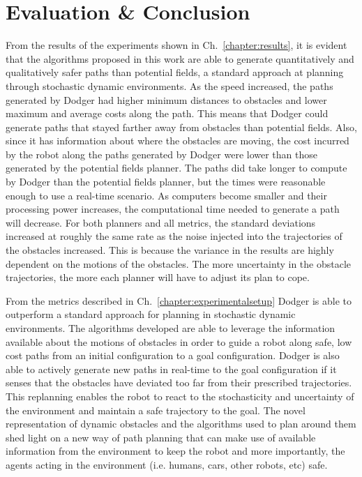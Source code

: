 \section{Evaluation \& Conclusion}

From the results of the experiments shown in Ch.~\ref{chapter:results}, it is
evident that the algorithms proposed in this work are able to generate
quantitatively and qualitatively safer paths than potential fields, a standard
approach at planning through stochastic dynamic environments. As the speed
increased, the paths generated by Dodger had higher minimum distances to
obstacles and lower maximum and average costs along the path. This means that
Dodger could generate paths that stayed farther away from obstacles than
potential fields. Also, since it has information about where the obstacles are
moving, the cost incurred by the robot along the paths generated by Dodger were
lower than those generated by the potential fields planner. The paths did take
longer to compute by Dodger than the potential fields planner, but the times
were reasonable enough to use a real-time scenario. As computers become smaller
and their processing power increases, the computational time needed to generate
a path will decrease. For both planners and all metrics, the standard
deviations increased at roughly the same rate as the noise injected into the
trajectories of the obstacles increased. This is because the variance in the
results are highly dependent on the motions of the obstacles. The more
uncertainty in the obstacle trajectories, the more each planner will have to
adjust its plan to cope.

From the metrics described in Ch.~\ref{chapter:experimentalsetup} Dodger is
able to outperform a standard approach for planning in stochastic dynamic
environments. The algorithms developed are able to leverage the information
available about the motions of obstacles in order to guide a robot along safe,
low cost paths from an initial configuration to a goal configuration. Dodger is
also able to actively generate new paths in real-time to the goal configuration
if it senses that the obstacles have deviated too far from their prescribed
trajectories. This replanning enables the robot to react to the stochasticity
and uncertainty of the environment and maintain a safe trajectory to the goal.
The novel representation of dynamic obstacles and the algorithms used to plan
around them shed light on a new way of path planning that can make use of
available information from the environment to keep the robot and more
importantly, the agents acting in the environment (i.e. humans, cars, other
robots, etc) safe.


